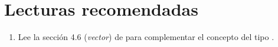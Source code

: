 \section{Lecturas recomendadas}

\begin{enumerate}

\item Lee la sección 4.6 (\emph{vector}) 
      de \pppbook{}
      para complementar el concepto del tipo .

\end{enumerate}
